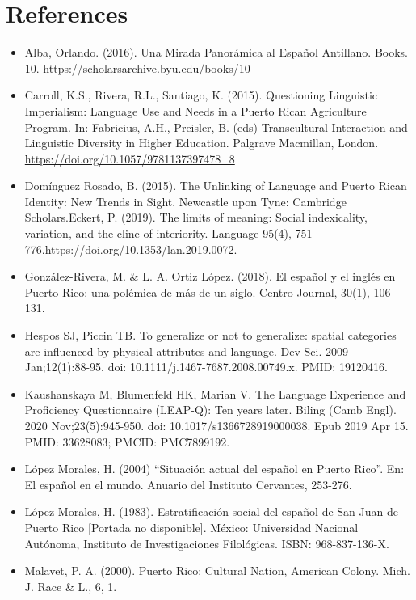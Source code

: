 \documentclass[
  a4paper,
  11pt,
  twocolumn]{article}
\begin{document}
\section{References}

\begin{itemize}
\item
  Alba, Orlando. (2016). Una Mirada Panorámica al Español Antillano.
  Books. 10. \url{https://scholarsarchive.byu.edu/books/10}
\item
  Carroll, K.S., Rivera, R.L., Santiago, K. (2015). Questioning
  Linguistic Imperialism: Language Use and Needs in a Puerto Rican
  Agriculture Program. In: Fabricius, A.H., Preisler, B. (eds)
  Transcultural Interaction and Linguistic Diversity in Higher
  Education. Palgrave Macmillan, London.
  \url{https://doi.org/10.1057/9781137397478_8}
\item
  Domínguez Rosado, B. (2015). The Unlinking of Language and Puerto
  Rican Identity: New Trends in Sight. Newcastle upon Tyne: Cambridge
  Scholars.Eckert, P. (2019). The limits of meaning: Social
  indexicality, variation, and the cline of interiority. Language 95(4),
  751-776.https://doi.org/10.1353/lan.2019.0072.
\item
  González-Rivera, M. \& L. A. Ortiz López. (2018). El español y el
  inglés en Puerto Rico: una polémica de más de un siglo. Centro
  Journal, 30(1), 106-131.
\item
  Hespos SJ, Piccin TB. To generalize or not to generalize: spatial
  categories are influenced by physical attributes and language. Dev
  Sci. 2009 Jan;12(1):88-95. doi: 10.1111/j.1467-7687.2008.00749.x.
  PMID: 19120416.
\item
  Kaushanskaya M, Blumenfeld HK, Marian V. The Language Experience and
  Proficiency Questionnaire (LEAP-Q): Ten years later. Biling (Camb
  Engl). 2020 Nov;23(5):945-950. doi: 10.1017/s1366728919000038. Epub
  2019 Apr 15. PMID: 33628083; PMCID: PMC7899192.
\item
  López Morales, H. (2004) ``Situación actual del español en Puerto
  Rico''. En: El español en el mundo. Anuario del Instituto Cervantes,
  253-276.
\item
  López Morales, H. (1983). Estratificación social del español de San
  Juan de Puerto Rico {[}Portada no disponible{]}. México: Universidad
  Nacional Autónoma, Instituto de Investigaciones Filológicas. ISBN:
  968-837-136-X.
\item
  Malavet, P. A. (2000). Puerto Rico: Cultural Nation, American Colony.
  Mich. J. Race \& L., 6, 1.

\end{itemize}
\end{document}
